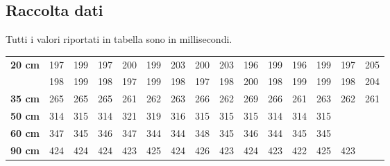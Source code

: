 \subsection{Raccolta dati}
Tutti i valori riportati in tabella sono in millisecondi.
\begin{center}
\begin{tabular}{r|*{14}{c}}
\textbf{20 cm} & 197 & 199 & 197 & 200 & 199 & 203 & 200 & 203 & 196 & 199 & 196 & 199 & 197 & 205\\
& 198 & 199 & 198 & 197 & 199 & 198 & 197 & 198 & 200 & 198 & 199 & 199 & 198 & 204\\
\midrule
\textbf{35 cm} & 265 & 265 & 265 & 261 & 262 & 263 & 266 & 262 & 269 & 266 & 261 & 263 & 262 & 261\\
\midrule
\textbf{50 cm} & 314 & 315 & 314 & 321 & 319 & 316 & 315 & 315 & 315 & 314 & 314 & 315\\
\midrule
\textbf{60 cm} & 347 & 345 & 346 & 347 & 344 & 344 & 348 & 345 & 346 & 344 & 345 & 345\\
\midrule
\textbf{90 cm} & 424& 424& 424& 423& 425& 424& 426& 423& 424& 423& 422& 425& 423\\
\end{tabular}
\end{center}

